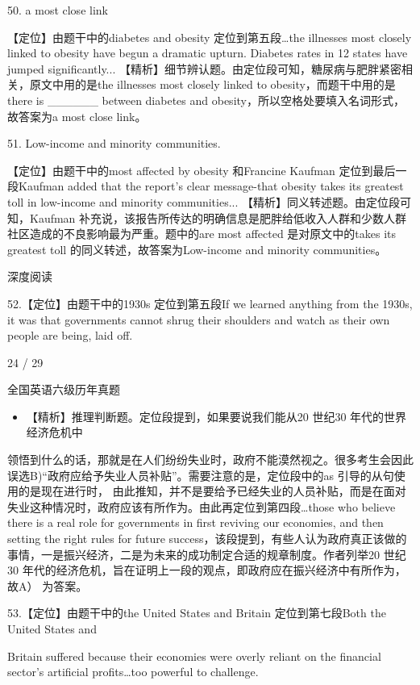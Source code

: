 \documentclass[UTF8,11pt]{ctexart}
\begin{document}
50. a most close link


【定位】由题干中的diabetes and obesity 定位到第五段…the illnesses most closely linked to obesity have begun a dramatic upturn. Diabetes rates in 12 states have jumped significantly... 【精析】细节辨认题。由定位段可知，糖尿病与肥胖紧密相关，原文中用的是the illnesses most closely linked to obesity，而题干中用的是there is \_\_\_\_\_\_ between diabetes and obesity，所以空格处要填入名词形式，故答案为a most close link。


51. Low-income and minority communities.


【定位】由题干中的most affected by obesity 和Francine Kaufman 定位到最后一段Kaufman added that the report's clear message-that obesity takes its greatest toll in low-income and minority communities... 【精析】同义转述题。由定位段可知，Kaufman 补充说，该报告所传达的明确信息是\textemdash{}肥胖给低收入人群和少数人群社区造成的不良影响最为严重。题中的are most affected 是对原文中的takes its greatest toll 的同义转述，故答案为Low-income and minority communities。


深度阅读


52.【定位】由题干中的1930s 定位到第五段If we learned anything from the 1930s, it was that governments cannot shrug their shoulders and watch as their own people are being, laid off.


24 / 29


全国英语六级历年真题


\begin{itemize}[leftmargin=2em,itemsep=.2em,topsep=.4em]\item[A.] 【精析】推理判断题。定位段提到，如果要说我们能从20 世纪30 年代的世界经济危机中
\end{itemize}

领悟到什么的话，那就是在人们纷纷失业时，政府不能漠然视之。很多考生会因此误选B)“政府应给予失业人员补贴”。需要注意的是，定位段中的as 引导的从句使用的是现在进行时， 由此推知，并不是要给予已经失业的人员补贴，而是在面对失业这种情况时，政府应该有所作为。由此再定位到第四段…those who believe there is a real role for governments in first reviving our economies, and then setting the right rules for future success，该段提到，有些人认为政府真正该做的事情，一是振兴经济，二是为未来的成功制定合适的规章制度。作者列举20 世纪30 年代的经济危机，旨在证明上一段的观点，即政府应在振兴经济中有所作为，故A） 为答案。


53.【定位】由题干中的the United States and Britain 定位到第七段Both the United States and


Britain suffered because their economies were overly reliant on the financial sector's artificial profits…too powerful to challenge.
\end{document}
